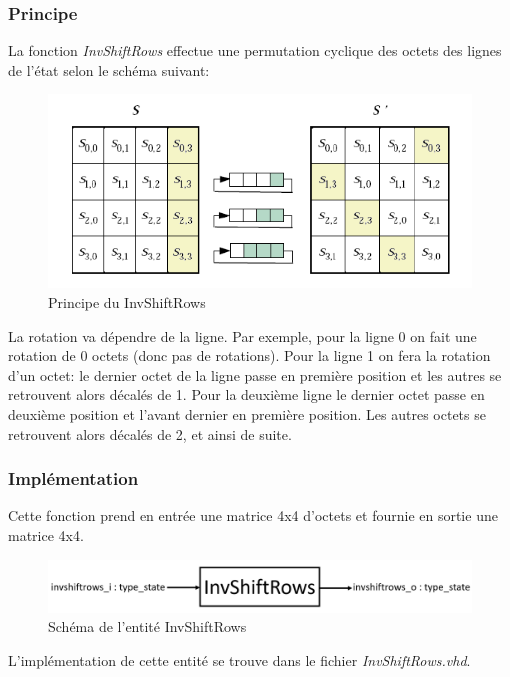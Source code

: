 \documentclass[a4paper, 12pt]{article}
\begin{document}
		\subsubsection{Principe}
	La fonction \emph{InvShiftRows} effectue une permutation cyclique des octets des lignes de l'état selon le schéma suivant: 
			\begin{figure}[H]
				\begin{center}
				\includegraphics[scale=0.9]{Images/InvShiftRows.png}
				\end{center}
				\caption{Principe du InvShiftRows}
				\label{InvShiftRows}
			\end{figure}
	La rotation va dépendre de la ligne. Par exemple, pour la ligne 0 on fait une rotation de 0 octets (donc pas de rotations). Pour la ligne 1 on fera la rotation d'un octet: le dernier octet de la ligne passe en première position et les autres se retrouvent alors décalés de 1. Pour la deuxième ligne le dernier octet passe en deuxième position et l'avant dernier en première position. Les autres octets se retrouvent alors décalés de 2, et ainsi de suite. 
	
		\subsubsection{Implémentation}
	Cette fonction prend en entrée une matrice 4x4 d'octets et fournie en sortie une matrice 4x4.
			\begin{figure}[H]
				\begin{center}
				\includegraphics[scale=0.4]{Images/InvShiftRowsEntity.png}
				\end{center}
				\caption{Schéma de l'entité InvShiftRows}
				\label{InvShiftRowsEntity}
			\end{figure}
	L'implémentation de cette entité se trouve dans le fichier \emph{InvShiftRows.vhd}.			
			
\end{document}
